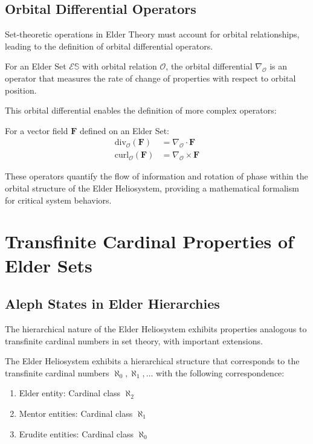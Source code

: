 \subsection{Orbital Differential Operators}

Set-theoretic operations in Elder Theory must account for orbital relationships, leading to the definition of orbital differential operators.

\begin{definition}
For an Elder Set $\mathcal{E}\mathbb{S}$ with orbital relation $\mathcal{O}$, the orbital differential $\nabla_{\mathcal{O}}$ is an operator that measures the rate of change of properties with respect to orbital position.
\end{definition}

This orbital differential enables the definition of more complex operators:

\begin{definition}
For a vector field $\mathbf{F}$ defined on an Elder Set:
\begin{align}
\text{div}_{\mathcal{O}}(\mathbf{F}) &= \nabla_{\mathcal{O}} \cdot \mathbf{F} \\
\text{curl}_{\mathcal{O}}(\mathbf{F}) &= \nabla_{\mathcal{O}} \times \mathbf{F}
\end{align}
\end{definition}

These operators quantify the flow of information and rotation of phase within the orbital structure of the Elder Heliosystem, providing a mathematical formalism for critical system behaviors.

\section{Transfinite Cardinal Properties of Elder Sets}

\subsection{Aleph States in Elder Hierarchies}

The hierarchical nature of the Elder Heliosystem exhibits properties analogous to transfinite cardinal numbers in set theory, with important extensions.

\begin{theorem}
The Elder Heliosystem exhibits a hierarchical structure that corresponds to the transfinite cardinal numbers $\aleph_0, \aleph_1, \ldots$ with the following correspondence:
\begin{enumerate}
    \item Elder entity: Cardinal class $\aleph_2$
    \item Mentor entities: Cardinal class $\aleph_1$
    \item Erudite entities: Cardinal class $\aleph_0$
\end{enumerate}
\end{theorem}

